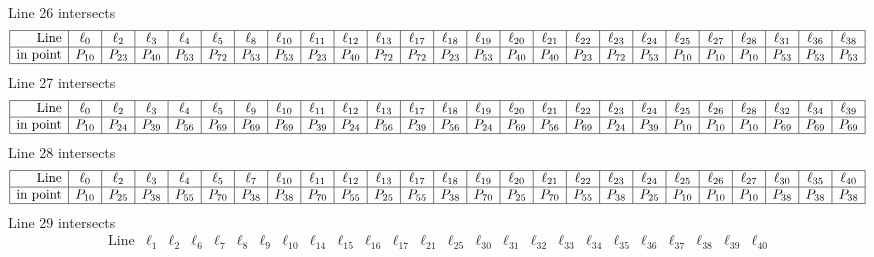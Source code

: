 \documentclass{article}
\begin{document}
{$$\begin{array}{|r*{24}{|c}|}
\end{array}
$$
Line 26 intersects 
$$
\begin{array}{|r*{24}{|c}|}
\hline
\mbox{Line}  & \ell_{0} & \ell_{2} & \ell_{3} & \ell_{4} & \ell_{5} & \ell_{8} & \ell_{10} & \ell_{11} & \ell_{12} & \ell_{13} & \ell_{17} & \ell_{18} & \ell_{19} & \ell_{20} & \ell_{21} & \ell_{22} & \ell_{23} & \ell_{24} & \ell_{25} & \ell_{27} & \ell_{28} & \ell_{31} & \ell_{36} & \ell_{38}\\
\hline
\mbox{in point}  & P_{10} & P_{23} & P_{40} & P_{53} & P_{72} & P_{53} & P_{53} & P_{23} & P_{40} & P_{72} & P_{72} & P_{23} & P_{53} & P_{40} & P_{40} & P_{23} & P_{72} & P_{53} & P_{10} & P_{10} & P_{10} & P_{53} & P_{53} & P_{53}\\
\hline
\end{array}
$$
Line 27 intersects 
$$
\begin{array}{|r*{24}{|c}|}
\hline
\mbox{Line}  & \ell_{0} & \ell_{2} & \ell_{3} & \ell_{4} & \ell_{5} & \ell_{9} & \ell_{10} & \ell_{11} & \ell_{12} & \ell_{13} & \ell_{17} & \ell_{18} & \ell_{19} & \ell_{20} & \ell_{21} & \ell_{22} & \ell_{23} & \ell_{24} & \ell_{25} & \ell_{26} & \ell_{28} & \ell_{32} & \ell_{34} & \ell_{39}\\
\hline
\mbox{in point}  & P_{10} & P_{24} & P_{39} & P_{56} & P_{69} & P_{69} & P_{69} & P_{39} & P_{24} & P_{56} & P_{39} & P_{56} & P_{24} & P_{69} & P_{56} & P_{69} & P_{24} & P_{39} & P_{10} & P_{10} & P_{10} & P_{69} & P_{69} & P_{69}\\
\hline
\end{array}
$$
Line 28 intersects 
$$
\begin{array}{|r*{24}{|c}|}
\hline
\mbox{Line}  & \ell_{0} & \ell_{2} & \ell_{3} & \ell_{4} & \ell_{5} & \ell_{7} & \ell_{10} & \ell_{11} & \ell_{12} & \ell_{13} & \ell_{17} & \ell_{18} & \ell_{19} & \ell_{20} & \ell_{21} & \ell_{22} & \ell_{23} & \ell_{24} & \ell_{25} & \ell_{26} & \ell_{27} & \ell_{30} & \ell_{35} & \ell_{40}\\
\hline
\mbox{in point}  & P_{10} & P_{25} & P_{38} & P_{55} & P_{70} & P_{38} & P_{38} & P_{70} & P_{55} & P_{25} & P_{55} & P_{38} & P_{70} & P_{25} & P_{70} & P_{55} & P_{38} & P_{25} & P_{10} & P_{10} & P_{10} & P_{38} & P_{38} & P_{38}\\
\hline
\end{array}
$$
Line 29 intersects 
$$
\begin{array}{|r*{24}{|c}|}
\hline
\mbox{Line}  & \ell_{1} & \ell_{2} & \ell_{6} & \ell_{7} & \ell_{8} & \ell_{9} & \ell_{10} & \ell_{14} & \ell_{15} & \ell_{16} & \ell_{17} & \ell_{21} & \ell_{25} & \ell_{30} & \ell_{31} & \ell_{32} & \ell_{33} & \ell_{34} & \ell_{35} & \ell_{36} & \ell_{37} & \ell_{38} & \ell_{39} & \ell_{40}\\

\end{array}$$}
\end{document}
